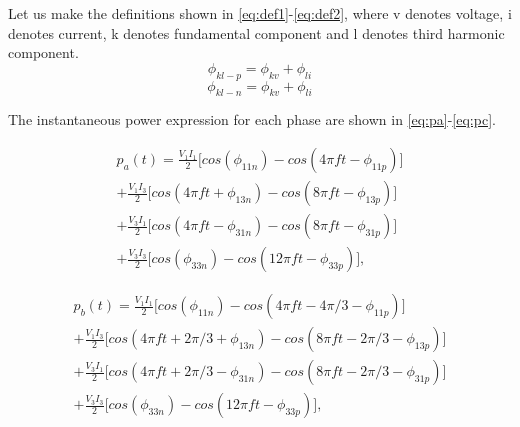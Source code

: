 \documentclass[conference,a4paper,twocolumn]{IEEEtran}
\begin{document}
Let us make the definitions shown in \ref{eq:def1}-\ref{eq:def2}, where v denotes voltage, i denotes current, k denotes fundamental component and l denotes third harmonic component.
\begin{equation} \label{eq:def1}
\phi_{kl-p} = \phi_{kv}+\phi_{li}
\end{equation}
\begin{equation} \label{eq:def2}
\phi_{kl-n} = \phi_{kv}+\phi_{li}
\end{equation}

The instantaneous power expression for each phase are shown in \ref{eq:pa}-\ref{eq:pc}.

\begin{equation}
\label{eq:pa}
\begin{multlined}
p_a(t) = 
\frac{V_1I_1}{2} \bigg \lbrack cos(\phi_{11n})-cos(4\pi ft-\phi_{11p}) \bigg \rbrack
\\
+
\frac{V_1I_3}{2} \bigg \lbrack cos(4\pi ft+\phi_{13n})-cos(8\pi ft-\phi_{13p}) \bigg \rbrack
\\
+
\frac{V_3I_1}{2} \bigg \lbrack cos(4\pi ft-\phi_{31n})-cos(8\pi ft-\phi_{31p}) \bigg \rbrack
\\
+
\frac{V_3I_3}{2} \bigg \lbrack cos(\phi_{33n})-cos(12\pi ft-\phi_{33p}) \bigg \rbrack,
\end{multlined}
\end{equation}

\begin{equation}
\label{eq:pb}
\begin{multlined}
p_b(t) = 
\frac{V_1I_1}{2} \bigg \lbrack cos(\phi_{11n})-cos(4\pi ft-4\pi/3-\phi_{11p}) \bigg \rbrack
\\
+
\frac{V_1I_3}{2} \bigg \lbrack cos(4\pi ft+ 2\pi/3+\phi_{13n})-cos(8\pi ft-2\pi/3-\phi_{13p}) \bigg \rbrack
\\
+
\frac{V_3I_1}{2} \bigg \lbrack cos(4\pi ft+2\pi/3-\phi_{31n})-cos(8\pi ft-2\pi/3-\phi_{31p}) \bigg \rbrack
\\
+
\frac{V_3I_3}{2} \bigg \lbrack cos(\phi_{33n})-cos(12\pi ft-\phi_{33p}) \bigg \rbrack,
\end{multlined}
\end{equation}
\end{document}
